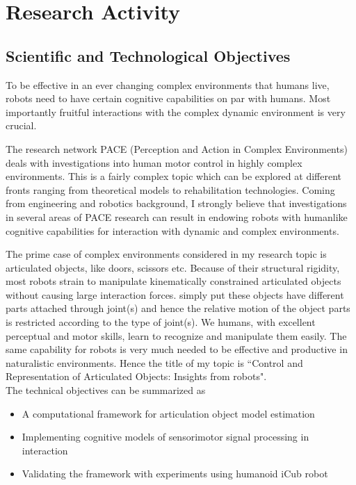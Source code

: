 \documentclass[12pt,a4paper]{report}
\begin{document}
\section{Research Activity}
\subsection{Scientific and Technological Objectives}

To be effective in an ever changing complex environments that humans live, robots need to have certain cognitive capabilities on par with humans. Most importantly fruitful interactions with the complex dynamic environment is very crucial. 

The research network PACE (Perception and Action in Complex Environments) deals with investigations into human motor control in highly complex environments. This is a fairly complex topic which can be explored at different fronts ranging from theoretical models to rehabilitation technologies. Coming from engineering and robotics background, I strongly believe that investigations in several areas of PACE research can result in endowing robots with humanlike cognitive capabilities for interaction with dynamic and complex environments. 

The prime case of complex environments considered in my research topic is articulated objects, like doors, scissors etc. Because of their structural rigidity, most robots strain to manipulate kinematically constrained articulated objects without causing large interaction forces. simply put these objects have different parts attached through joint(s) and hence the relative motion of the object parts is restricted according to the type of joint(s). We humans, with excellent perceptual and motor skills, learn to recognize and manipulate them easily. The same capability for robots is very much needed to be effective and productive in naturalistic environments. Hence the title of my topic is ``Control and Representation of Articulated Objects: Insights from robots". \\

The technical objectives can be summarized as 
\begin{itemize}
	\item A computational framework for articulation object model estimation
	\item Implementing cognitive models of sensorimotor signal processing in interaction 
	\item Validating the framework with experiments using humanoid iCub robot
\end{itemize}
\end{document}
